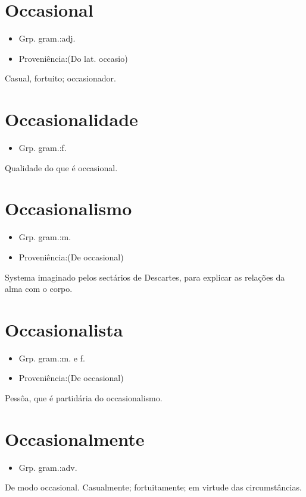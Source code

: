 \section{Occasional}
\begin{itemize}
\item {Grp. gram.:adj.}
\end{itemize}
\begin{itemize}
\item {Proveniência:(Do lat. \textunderscore occasio\textunderscore )}
\end{itemize}
Casual, fortuito; occasionador.
\section{Occasionalidade}
\begin{itemize}
\item {Grp. gram.:f.}
\end{itemize}
Qualidade do que é occasional.
\section{Occasionalismo}
\begin{itemize}
\item {Grp. gram.:m.}
\end{itemize}
\begin{itemize}
\item {Proveniência:(De \textunderscore occasional\textunderscore )}
\end{itemize}
Systema imaginado pelos sectários de Descartes, para explicar as relações da alma com o corpo.
\section{Occasionalista}
\begin{itemize}
\item {Grp. gram.:m.  e  f.}
\end{itemize}
\begin{itemize}
\item {Proveniência:(De \textunderscore occasional\textunderscore )}
\end{itemize}
Pessôa, que é partidária do occasionalismo.
\section{Occasionalmente}
\begin{itemize}
\item {Grp. gram.:adv.}
\end{itemize}
De modo occasional.
Casualmente; fortuitamente; em virtude das circumstâncias.
